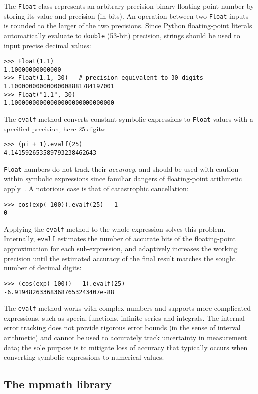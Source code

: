 The \texttt{Float} class represents an arbitrary-precision binary floating-point
number by storing its value and precision (in bits).
An operation between two \texttt{Float}
inputs is rounded to the larger of the two precisions.
Since Python floating-point literals automatically evaluate to \texttt{double}
(53-bit) precision, strings should be used to input precise decimal values:

\begin{verbatim}
>>> Float(1.1)
1.10000000000000
>>> Float(1.1, 30)   # precision equivalent to 30 digits
1.10000000000000008881784197001
>>> Float("1.1", 30)
1.10000000000000000000000000000
\end{verbatim}
The \texttt{evalf} method converts constant symbolic expressions
to \texttt{Float} values with a specified precision, here 25 digits:
\begin{verbatim}
>>> (pi + 1).evalf(25)
4.141592653589793238462643
\end{verbatim}
\texttt{Float} numbers do not track their \emph{accuracy},
and should be used with caution within symbolic expressions
since familiar dangers of floating-point arithmetic apply~\cite{goldberg1991every}.
A notorious case is that of catastrophic cancellation:
\begin{verbatim}
>>> cos(exp(-100)).evalf(25) - 1
0
\end{verbatim}
Applying the \texttt{evalf} method to the whole expression solves
this problem. Internally, \texttt{evalf} estimates the number of accurate
bits of the floating-point
approximation for each sub-expression, and adaptively increases the
working precision until the estimated accuracy of the
final result matches the sought number of decimal digits:
\begin{verbatim}
>>> (cos(exp(-100)) - 1).evalf(25)
-6.919482633683687653243407e-88
\end{verbatim}
The \texttt{evalf} method works with complex numbers and supports
more complicated expressions, such as
special functions, infinite series and integrals.
The internal error tracking does not provide rigorous error bounds
(in the sense of interval arithmetic) and cannot be used to accurately track
uncertainty in measurement data;
the sole purpose is to mitigate loss of accuracy that typically occurs
when converting symbolic expressions to numerical values.

\subsection{The mpmath library}

